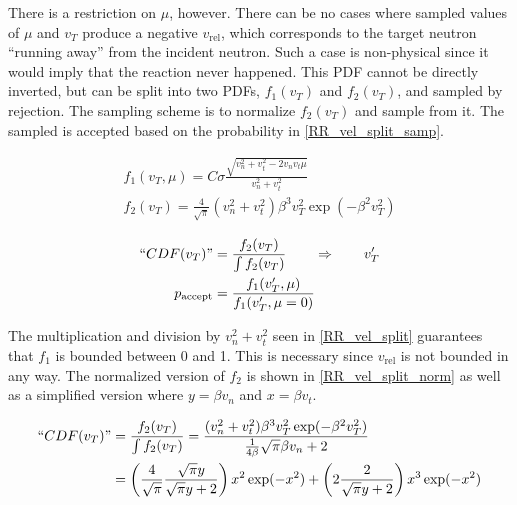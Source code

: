 There is a restriction on $\mu$, however.  There can be no cases where sampled values of $\mu$ and $v_T$ produce a negative $v_\mathrm{rel}$, which corresponds to the target neutron ``running away'' from the incident neutron.  Such a case is non-physical since it would imply that the reaction never happened.  This PDF cannot be directly inverted, but can be split into two PDFs, $f_1(v_T)$ and $f_2(v_T)$, and sampled by rejection.  The sampling scheme is to normalize $f_2(v_T)$ and sample from it.  The sampled is accepted based on the probability in \eqref{RR_vel_split_samp}\cite{openmc}.

\begin{equation}
\label{RR_vel_split}
\begin{gathered}
f_1(v_T,\mu) = C \sigma  \frac{\sqrt{v_n^2+v_t^2-2 v_n v_t \mu}}{v_n^2+v_t^2}\\
f_2(v_T) =  \frac{4}{\sqrt{\pi}} (v_n^2+v_t^2) \beta^3 v_T^2  \exp ( -\beta^2  v_T^2 )
\end{gathered}
\end{equation}

\begin{equation}
\label{RR_vel_split_samp}
\begin{split}
``CDF(v_T)" &= \frac{f_2(v_T)}{\int f_2(v_T)} \qquad \Rightarrow \qquad v_T^\prime  \\
p_\mathrm{accept} &= \frac{f_1(v_T^\prime,\mu)}{ f_1(v_T^\prime,\mu=0)}
\end{split}
\end{equation}

The multiplication and division by $v_n^2+v_t^2$ seen in \eqref{RR_vel_split} guarantees that $f_1$ is bounded between 0 and 1.  This is necessary since $v_\mathrm{rel}$ is not bounded in any way.  The normalized version of $f_2$ is shown in \eqref{RR_vel_split_norm} as well as a simplified version where $y=\beta v_n$ and $x=\beta v_t$.

\begin{equation}
\label{RR_vel_split_norm}
\begin{split}
``CDF(v_T)" &=  \frac{f_2(v_T)}{\int f_2(v_T)} = \frac{  (v_n^2+v_t^2) \beta^3 v_T^2  \exp ( -\beta^2  v_T^2 ) }{ \frac{1}{4\beta} \sqrt{\pi} \beta v_n +2 } \\
&= \left( \frac{4}{\sqrt{\pi}}  \frac{\sqrt{\pi}y}{\sqrt{\pi}y+2} \right) x^2 \exp(-x^2)  + \left( 2  \frac{2}{\sqrt{\pi}y+2} \right) x^3 \exp(-x^2) \\
\end{split}
\end{equation}

